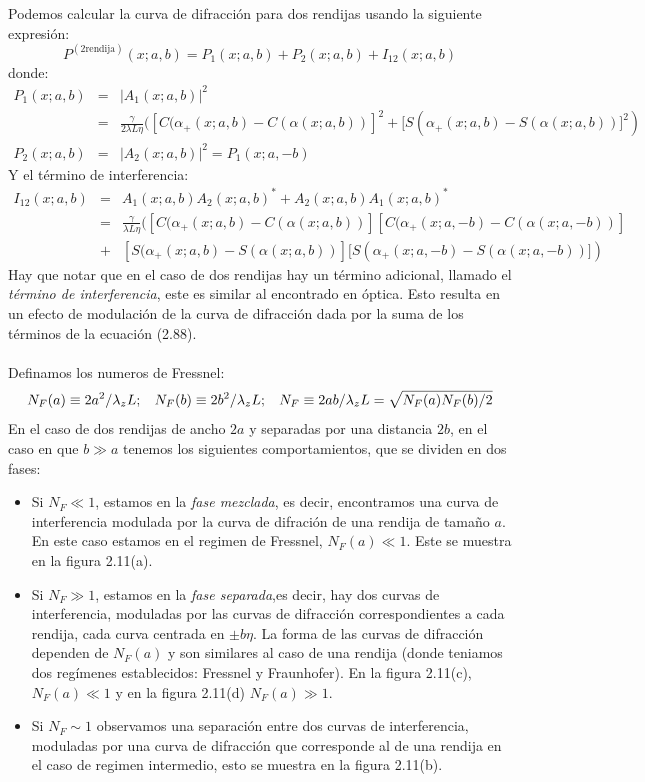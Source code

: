 Podemos calcular la curva de difracción para dos rendijas usando la siguiente expresión:
\begin{equation}
P^{(2\text{rendija})}(x;a,b)=P_{1}(x;a,b)+P_{2}(x;a,b)+I_{12}(x;a,b)
\end{equation}
donde:
\begin{eqnarray}
\nonumber P_{1}(x;a,b)&=&|A_1(x;a,b)|^2\\
\nonumber &=&\frac{\gamma}{2\lambda L\eta}([C(\alpha_{+}(x;a,b)-C(\alpha(x;a,b))]^{2}+[S(\alpha_{+}(x;a,b)-S(\alpha(x;a,b))]^{2})\\
P_2(x;a,b)&=&|A_2(x;a,b)|^2=P_1(x;a,-b)
\end{eqnarray}
Y el término de interferencia:
\begin{eqnarray}
\nonumber I_{12}(x;a,b)&=& A_1(x;a,b)A_2(x;a,b)^*+A_2(x;a,b)A_1(x;a,b)^*\\
\nonumber &=&\frac{\gamma}{\lambda L\eta}([C(\alpha_{+}(x;a,b)-C(\alpha(x;a,b))][C(\alpha_{+}(x;a,-b)-C(\alpha(x;a,-b))]\\
&+& [S(\alpha_{+}(x;a,b)-S(\alpha(x;a,b))][S(\alpha_{+}(x;a,-b)-S(\alpha(x;a,-b))])
\end{eqnarray}
Hay que notar que en el caso de dos rendijas hay un término adicional, llamado el \textit{término de interferencia}, este es similar al encontrado en óptica. Esto resulta en un efecto de modulación de la curva de difracción dada por la suma de los términos de la ecuación (2.88).\\
\\
Definamos los numeros de Fressnel:
\begin{equation}
N_F(a)\equiv 2a^2/\lambda_zL ;\hspace{0.3cm} N_F(b)\equiv 2b^2/\lambda_zL ;\hspace{0.3cm} N_F\equiv 2ab/\lambda_zL=\sqrt{N_F(a)N_F(b)/2}
\end{equation}
En el caso de dos rendijas de ancho $2a$ y separadas por una distancia $2b$, en el caso en que $b\gg a$ tenemos los siguientes comportamientos, que se dividen en dos fases:
\begin{itemize}
\item Si $N_F\ll 1$, estamos en la \textit{fase mezclada}, es decir, encontramos una curva de interferencia modulada por la curva de difración de una rendija de tamaño $a$. En este caso estamos en el regimen de Fressnel, $N_F(a)\ll 1$. Este se muestra en la figura 2.11(a). 
\item Si $N_F\gg 1$, estamos en la \textit{fase separada},es decir, hay dos curvas de interferencia, moduladas por las curvas de difracción correspondientes a cada rendija, cada curva centrada en $\pm b\eta$.	La forma de las curvas de difracción dependen de $N_F(a)$ y son similares al caso de una rendija (donde teniamos dos regímenes establecidos: Fressnel y Fraunhofer). En la figura 2.11(c), $N_F(a)\ll 1$ y en la figura 2.11(d) $N_F(a)\gg 1$.
\item Si $N_F\sim 1$ observamos una separación entre dos curvas de interferencia, moduladas por una curva de difracción que corresponde al de una rendija en el caso de regimen intermedio, esto se muestra en la figura 2.11(b). 
\end{itemize}
